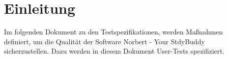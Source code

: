 
\chapter{Einleitung}
Im folgenden Dokument zu den Testspezifikationen, werden Maßnahmen definiert, um die Qualität der Software Norbert - Your StdyBuddy sicherzustellen. Dazu werden in diesem Dokument User-Tests spezifiziert. \\ 





